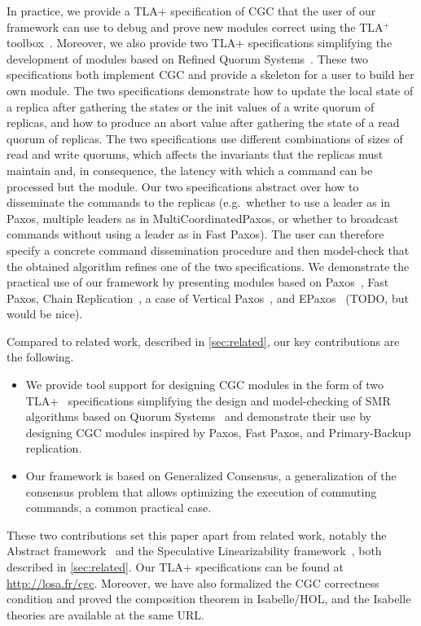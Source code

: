 In practice, we provide a TLA+ specification of CGC that the user of our framework can use to debug and prove new modules correct using the TLA$^+$ toolbox~\cite{TLATools}.
Moreover, we also provide two TLA+ specifications simplifying the development of modules based on Refined Quorum Systems~\cite{GuerraouiVukolic10RefinedQuorumSystems}. These two specifications both implement CGC and provide a skeleton for a user to build her own module. The two specifications demonstrate how to update the local state of a replica after gathering the states or the init values of a write quorum of replicas, and how to
produce an abort value after gathering the state of a read quorum of replicas. 
The two specifications use different combinations of sizes of read and write quorums, which affects the invariants that the replicas must maintain and, in consequence, the latency with which a command can be processed but the module.
Our two specifications abstract over how to disseminate the commands to the replicas (e.g.\ whether to use a leader as in Paxos, multiple leaders as in MultiCoordinatedPaxos, or whether to broadcast commands without using a leader as in Fast Paxos).
The user can therefore specify a concrete command dissemination procedure and then model-check that the obtained algorithm refines one of the two specifications.  
We demonstrate the practical use of our framework by presenting modules based on Paxos~\cite{Lamport98ParttimeParliament}, Fast Paxos\cite{Lamport06FastPaxos}, Chain Replication~\cite{RenesseSchneider04ChainReplicationSupportingHighThroughputAvailability}, a case of Vertical Paxos~\cite{LamportMalkhiZhou09VerticalPaxosPrimarybackupReplication}, and EPaxos~\cite{MoraruAndersenKaminsky13ThereIsMoreConsensusEgalitarianParliaments}
(TODO, but would be nice).

Compared to related work, described in \cref{sec:related}, our key contributions are the following.
\begin{itemize}
    \item We provide tool support for designing CGC modules in the form of two TLA+~\cite{Lamport02SpecifyingSystems} specifications simplifying the design and model-checking of SMR algorithms based on Quorum Systems~\cite{GuerraouiVukolic10RefinedQuorumSystems} and demonstrate their use by designing CGC modules inspired by Paxos, Fast Paxos, and Primary-Backup replication.
    \item Our framework is based on Generalized Consensus, a generalization of the consensus problem 
        that allows optimizing the execution of commuting commands, a common practical case.
\end{itemize}
These two contributions set this paper apart from related work, notably the Abstract framework~\cite{GuerraouiETAL10Next700BftProtocols} and the Speculative Linearizability framework~\cite{GuerraouiKuncakLosa12SpeculativeLinearizability}, both described in \cref{sec:related}.
Our TLA+ specifications can be found at \url{http://losa.fr/cgc}.
Moreover, we have also formalized the CGC correctness condition and proved the composition theorem in Isabelle/HOL\@, and the Isabelle theories are available at the same URL\@.
